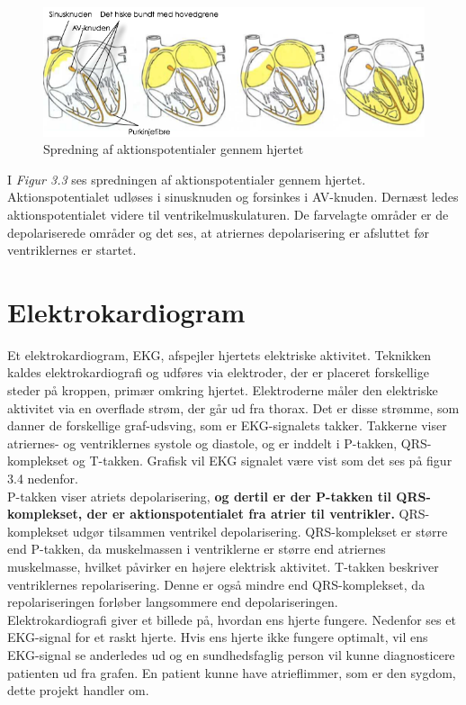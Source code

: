 \begin{figure}[htb]

	\centering	
	\includegraphics[width=1\textwidth]{Figurer/Snip20150410_6}
	\caption{Spredning af aktionspotentialer gennem hjertet \protect\footnotemark}
\end{figure}

I \textit{Figur 3.3} ses spredningen af aktionspotentialer gennem hjertet. Aktionspotentialet udløses i sinusknuden og forsinkes i AV-knuden. Dernæst ledes aktionspotentialet videre til ventrikelmuskulaturen. De farvelagte områder er de depolariserede områder og det ses, at atriernes depolarisering er afsluttet før ventriklernes er startet.

\section{Elektrokardiogram}
Et elektrokardiogram, EKG, afspejler hjertets elektriske aktivitet. Teknikken kaldes elektrokardiografi og udføres via elektroder, der er placeret forskellige steder på kroppen, primær omkring hjertet. Elektroderne måler den elektriske aktivitet via en overflade strøm, der går ud fra thorax. Det er disse strømme, som danner de forskellige graf-udsving, som er EKG-signalets takker. Takkerne viser atriernes- og ventriklernes systole og diastole, og er inddelt i P-takken, QRS-komplekset og T-takken. Grafisk vil EKG signalet være vist som det ses på figur 3.4 nedenfor.\\
P-takken viser atriets depolarisering, \textbf{og dertil er der P-takken til QRS-komplekset, der er aktionspotentialet fra atrier til ventrikler.} QRS-komplekset udgør tilsammen ventrikel depolarisering. QRS-komplekset er større end P-takken, da muskelmassen i ventriklerne er større end atriernes muskelmasse, hvilket påvirker en højere elektrisk aktivitet. T-takken beskriver ventriklernes repolarisering. Denne er også mindre end QRS-komplekset, da repolariseringen forløber langsommere end depolariseringen.\\
Elektrokardiografi giver et billede på, hvordan ens hjerte fungere. Nedenfor ses et EKG-signal for et raskt hjerte. Hvis ens hjerte ikke fungere optimalt, vil ens EKG-signal se anderledes ud og en sundhedsfaglig person vil kunne diagnosticere patienten ud fra grafen.  En patient kunne have atrieflimmer, som er den sygdom, dette projekt handler om.  

